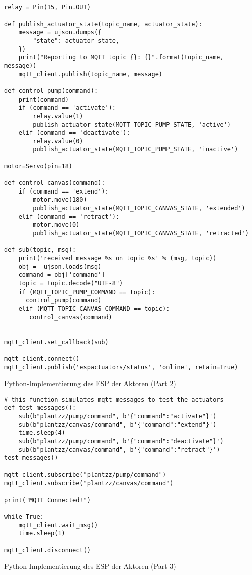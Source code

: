 \begin{listing}[!ht]
\begin{verbatim}


relay = Pin(15, Pin.OUT)

def publish_actuator_state(topic_name, actuator_state):
    message = ujson.dumps({
        "state": actuator_state,
    })
    print("Reporting to MQTT topic {}: {}".format(topic_name, message))
    mqtt_client.publish(topic_name, message)
    
def control_pump(command):
    print(command)
    if (command == 'activate'):
        relay.value(1)
        publish_actuator_state(MQTT_TOPIC_PUMP_STATE, 'active')
    elif (command == 'deactivate'):
        relay.value(0)
        publish_actuator_state(MQTT_TOPIC_PUMP_STATE, 'inactive')

motor=Servo(pin=18)

def control_canvas(command):
    if (command == 'extend'):
        motor.move(180)
        publish_actuator_state(MQTT_TOPIC_CANVAS_STATE, 'extended')
    elif (command == 'retract'):
        motor.move(0)
        publish_actuator_state(MQTT_TOPIC_CANVAS_STATE, 'retracted')

def sub(topic, msg):
    print('received message %s on topic %s' % (msg, topic))
    obj =  ujson.loads(msg)
    command = obj['command']
    topic = topic.decode("UTF-8")
    if (MQTT_TOPIC_PUMP_COMMAND == topic):
      control_pump(command)
    elif (MQTT_TOPIC_CANVAS_COMMAND == topic):
       control_canvas(command)
    

mqtt_client.set_callback(sub)

mqtt_client.connect()
mqtt_client.publish('espactuators/status', 'online', retain=True)
\end{verbatim}
\caption{Python-Implementierung des ESP der Aktoren (Part 2)}
\label{list:wokwi_aktoren2}
\end{listing}



\begin{listing}[!ht]
\begin{verbatim}
# this function simulates mqtt messages to test the actuators
def test_messages():
    sub(b"plantzz/pump/command", b'{"command":"activate"}')
    sub(b"plantzz/canvas/command", b'{"command":"extend"}')
    time.sleep(4)
    sub(b"plantzz/pump/command", b'{"command":"deactivate"}')
    sub(b"plantzz/canvas/command", b'{"command":"retract"}')
test_messages()

mqtt_client.subscribe("plantzz/pump/command")
mqtt_client.subscribe("plantzz/canvas/command")

print("MQTT Connected!")

while True:
    mqtt_client.wait_msg()
    time.sleep(1)

mqtt_client.disconnect()
\end{verbatim}
\caption{Python-Implementierung des ESP der Aktoren (Part 3)}
\label{list:wokwi_aktoren3}
\end{listing}